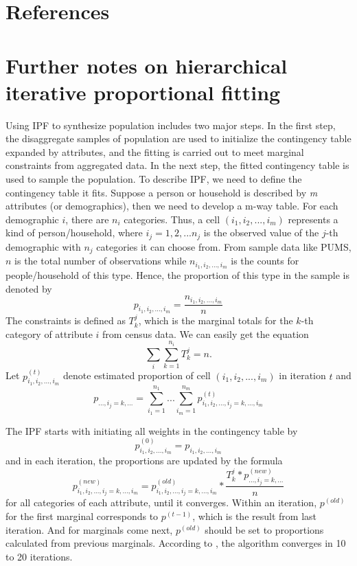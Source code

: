 \documentclass[11pt,twoside]{article}
\numberwithin{equation}{section}
\newcommand{\?}{\stackrel{?}{=}}
\begin{document}
\section{References}
\printbibliography

\appendix
\section{Further notes on hierarchical iterative proportional fitting}
Using IPF to synthesize population includes two major steps.
In the first step, the disaggregate samples of population are used to initialize the contingency table expanded by attributes, and the fitting is carried out to meet marginal constraints from aggregated data.
In the next step, the fitted contingency table is used to sample the population.
To describe IPF, we need to define the contingency table it fits.
Suppose a person or household is described by \textit{m} attributes (or demographics), then we need to develop a m-way table.
For each demographic $i$, there are $n_i$ categories.
Thus, a cell $(i_1, i_2,..., i_m)$ represents a kind of person/household, where $i_j = 1,2,...n_j$ is the observed value of the $j$-th demographic with $n_j$ categories it can choose from.
From sample data like PUMS, $n$ is the total number of observations while $n_{i_1, i_2,...,i_m}$ is the counts for people/household of this type.
Hence, the proportion of this type in the sample is denoted by
\begin{equation}
  \label{eqn:prop}
   p_{i_1,i_2,...,i_m} = \frac{n_{i_1, i_2,...,i_m}}{n}
\end{equation}
The constraints is defined as $T_k^j$, which is the marginal totals for the $k$-th category of attribute $i$ from census data.
We can easily get the equation
\begin{equation}
  \label{eq:2}
\sum_i\sum_{k=1}^{n_i}T_k^j=n.  
\end{equation}
Let $p_{i_1,i_2,...,i_m}^{(t)}$ denote estimated proportion of cell $(i_1, i_2,..., i_m)$ in iteration $t$ and
\begin{equation}
  \label{eq:3}
  p_{...,i_j=k,...} = \sum_{i_1=1}^{n_1}...\sum_{i_m=1}^{n_m}p_{i_1,i_2,...,i_j=k,...,i_m}^{(t)}  
\end{equation}

The IPF starts with initiating all weights in the contingency table by  
\begin{equation}
	p_{i_1,i_2,...,i_m}^{(0)} = p_{i_1,i_2,...,i_m}
\end{equation}
and in each iteration, the proportions are updated by the formula
\begin{equation}
  p_{i_1,i_2,...,i_j=k,...,i_m}^{(new)} = p_{i_1,i_2,...,i_j=k,...,i_m}^{(old)} * \frac{T_k^j * p_{...,i_j=k,...}^{(new)}}{n} 
\end{equation} for all categories of each attribute, until it converges.
Within an iteration, $p^{(old)}$ for the first marginal corresponds to $p^{(t-1)}$, which is the result from last iteration.
And for marginals come next, $p^{(old)}$ should be set to proportions calculated from previous marginals.
According to \cite{beckman1996creating}, the algorithm converges in 10 to 20 iterations.
\end{document}
